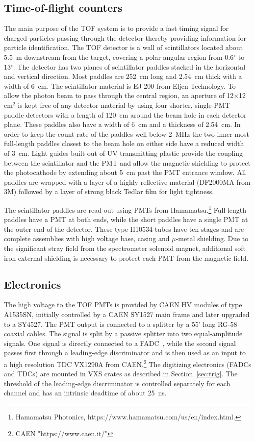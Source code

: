 \subsection[Time-of-Flight counters]{Time-of-flight counters \label{sec:tof}}
The main purpose of the TOF system is to provide a fast timing signal for charged particles passing through the detector thereby providing information for particle identification.
The TOF detector is a wall of scintillators located about 5.5~m downstream from the target, covering 
a polar angular region from 0.6$^{\circ}$ to 13$^{\circ}$. The detector has two planes of
scintillator paddles stacked in the horizontal and vertical direction. Most paddles are 252~cm long and 2.54~cm
thick with a width of 6~cm. 
The scintillator material is EJ-200 from Eljen Technology.
To allow the photon beam to pass through the central region,
an aperture of 12$\times$12\,cm$^2$ is kept
free of any detector material by using four shorter, single-PMT paddle detectors with a length of 120~cm around the beam hole
in each detector plane. These paddles also have a width of 6~cm and a thickness of 2.54~cm. In order to keep the
count rate of the paddles well below 2~MHz the two inner-most full-length paddles closest to the beam hole on either side have a reduced width of 3~cm.
Light guides built out of UV transmitting plastic provide the coupling between the scintillator and the PMT and allow the 
magnetic shielding to protect the photocathode by extending about 5~cm past the PMT entrance window. All paddles are wrapped
with a layer of a highly reflective material (DF2000MA from 3M) followed by a layer of strong black Tedlar film for light tightness. 

The scintillator paddles are read out using 
PMTs from Hamamatsu.\footnote{Hamamatsu Photonics, https://www.hamamatsu.com/us/en/index.html.} Full-length paddles
have a PMT at both ends, while the short paddles have a single PMT
at the outer end of the detector. These type H10534 tubes have ten stages and are complete assemblies with high voltage base, casing and $\mu$-metal shielding. Due to the significant stray field from the spectrometer solenoid magnet, additional soft iron external shielding is necessary to protect each PMT from the magnetic field.


\subsection{Electronics \label{sec:scelectronics}}
The high voltage to the TOF PMTs is provided by CAEN HV modules of type A1535SN, initially controlled by a CAEN SY1527 main frame and
later upgraded to a SY4527.
The PMT output is connected to a splitter by a 55' long RG-58 coaxial cables. The signal is split by
a passive splitter into two equal-amplitude signals. One signal is directly connected to a FADC~\cite{Dong:2007}, while the second signal passes first through a leading-edge discriminator and is then used as an input to a high resolution TDC VX1290A from CAEN.\footnote{CAEN "https://www.caen.it/"} The digitizing electronics (FADCs and TDCs) are mounted in VXS crates as described in Section~\ref{sec:trig}.
The threshold of the leading-edge discriminator is controlled separately for each channel and has an intrinsic
deadtime of about 25~ns.

